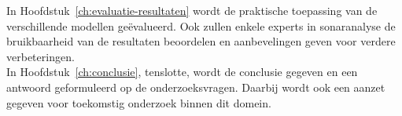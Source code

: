 In Hoofdstuk~\ref{ch:evaluatie-resultaten} wordt de praktische toepassing van de verschillende modellen geëvalueerd. Ook zullen enkele experts in sonaranalyse de bruikbaarheid van de resultaten beoordelen en aanbevelingen geven voor verdere verbeteringen. \\

In Hoofdstuk~\ref{ch:conclusie}, tenslotte, wordt de conclusie gegeven en een antwoord geformuleerd op de onderzoeksvragen. Daarbij wordt ook een aanzet gegeven voor toekomstig onderzoek binnen dit domein.